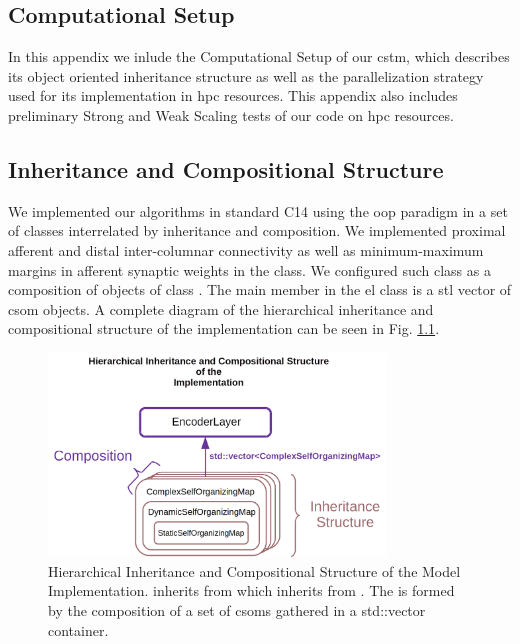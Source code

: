 \documentclass{book}
\newcommand{\CC}{C\nolinebreak\hspace{-.05em}\raisebox{.4ex}{\tiny\bf +}\nolinebreak\hspace{-.10em}\raisebox{.4ex}{\tiny\bf +}}
\begin{document}

\begin{appendices}

\chapter{Computational Setup}
\label{Comp_setup}

In this appendix we inlude the Computational Setup of our \gls{cstm}, which describes its object oriented inheritance structure as well as the parallelization strategy used for its implementation in \gls{hpc} resources. This appendix also includes preliminary Strong and Weak Scaling tests of our code on \gls{hpc} resources.


\section{Inheritance and Compositional Structure}

We implemented our algorithms in standard \CC14 using the \gls{oop} paradigm in a set of classes interrelated by inheritance and composition. We implemented proximal afferent and distal inter-columnar connectivity as well as minimum-maximum margins in afferent synaptic weights in the  class. We configured such class as a composition of objects of class . The main member in the \gls{el} class is a \gls{stl} vector of \gls{csom} objects. A complete diagram of the hierarchical inheritance and compositional structure of the implementation can be seen in Fig. \ref{fig:Skeleton}.

\begin{figure}[h!]
    \centering
    \includegraphics[width=0.8\textwidth]{Skeleton.png}
    \caption{Hierarchical Inheritance and Compositional Structure of the Model Implementation.
     inherits from  which inherits from .
    The  is formed by the composition of a set of \glspl{csom} gathered
    in a std::vector  container.}
    \label{fig:Skeleton}
\end{figure}


\end{appendices}
\end{document}
